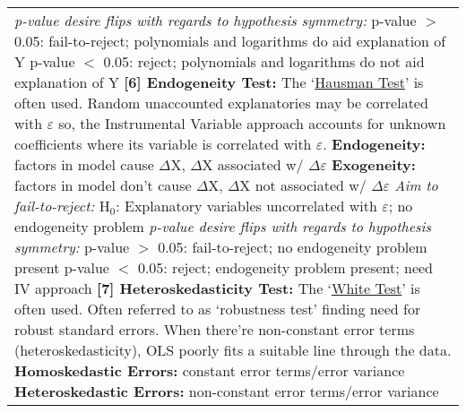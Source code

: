 \documentclass[11pt, english]{article}
\begin{document}
\begin{center}
\begin{longtable}{p{14cm}}
                \textit{p-value desire flips with regards to hypothesis symmetry:}\newline
                p-value $>$ 0.05: fail-to-reject; polynomials and logarithms do aid explanation of Y\newline
                p-value $<$ 0.05: reject; polynomials and logarithms do not aid explanation of Y\newline\newline
                \textbf{[6] Endogeneity Test: }The `\underline{Hausman Test}' is often used. Random unaccounted explanatories may be correlated with $\varepsilon$ so, the Instrumental Variable approach accounts for unknown coefficients where its variable is correlated with $\varepsilon$.\newline\newline
                \textbf{Endogeneity: }factors in model cause $\Delta$X, $\Delta$X associated w/ $\Delta\varepsilon$\newline
                \textbf{Exogeneity: }factors in model don't cause $\Delta$X, $\Delta$X not associated w/ $\Delta\varepsilon$\newline\newline 
                \textit{Aim to fail-to-reject:}\newline
                        H$_0$: Explanatory variables uncorrelated with $\varepsilon$; no endogeneity problem\newline\newline
		\textit{p-value desire flips with regards to hypothesis symmetry:}\newline
                p-value $>$ 0.05: fail-to-reject; no endogeneity problem present\newline
                p-value $<$ 0.05: reject; endogeneity problem present; need IV approach\newline\newline
                \textbf{[7] Heteroskedasticity Test: }The `\underline{White Test}' is often used. Often referred to as `robustness test' finding need for robust standard errors. When there're non-constant error terms (heteroskedasticity), OLS poorly fits a suitable line through the data.\newline\newline
                \textbf{Homoskedastic Errors: }constant error terms/error variance\newline
                \textbf{Heteroskedastic Errors: }non-constant error terms/error variance\newline\newline

\end{longtable}
\end{center}
\end{document}
